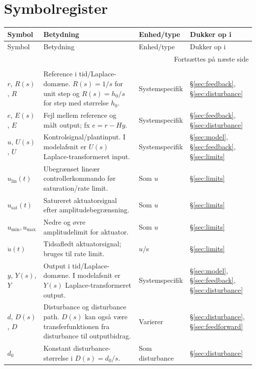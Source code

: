 \section{Symbolregister}
\label{sec:symbolregister}

\small
\begin{longtable}{@{}p{}p{}p{}p{}@{}}
\toprule
Symbol & Betydning & Enhed/type & Dukker op i \\
\midrule
\endfirsthead
\toprule
Symbol & Betydning & Enhed/type & Dukker op i \\
\midrule
\endhead
\midrule
\multicolumn{4}{r}{Fortsættes på næste side}\\
\endfoot
\bottomrule
\endlastfoot
\multicolumn{4}{@{}l}{\textbf{Signaler og signalveje}}\\
\(r\), \(R(s)\), \(R\) & Reference i tid/Laplace-domæne. \(R(s)=1/s\) for unit step og \(R(s)=h_0/s\) for step med størrelse \(h_0\). & Systemspecifik & \S\ref{sec:feedback}, \S\ref{sec:disturbance}\\
\(e\), \(E(s)\), \(E\) & Fejl mellem reference og målt output; fx \(e=r-Hy\). & Systemspecifik & \S\ref{sec:feedback}, \S\ref{sec:disturbance}\\
\(u\), \(U(s)\), \(U\) & Kontrolsignal/plantinput. I modelafsnit er \(U(s)\) Laplace-transformeret input. & Systemspecifik & \S\ref{sec:model}, \S\ref{sec:feedback}, \S\ref{sec:limits}\\
\(u_{\mathrm{lin}}(t)\) & Ubegrænset lineær controllerkommando før saturation/rate limit. & Som \(u\) & \S\ref{sec:limits}\\
\(u_{\mathrm{sat}}(t)\) & Satureret aktuatorsignal efter amplitudebegrænsning. & Som \(u\) & \S\ref{sec:limits}\\
\(u_{\min},u_{\max}\) & Nedre og øvre amplitudelimit for aktuator. & Som \(u\) & \S\ref{sec:limits}\\
\(\dot u(t)\) & Tidsafledt aktuatorsignal; bruges til rate limit. & \(u\)/s & \S\ref{sec:limits}\\
\(y\), \(Y(s)\), \(Y\) & Output i tid/Laplace-domæne. I modelafsnit er \(Y(s)\) Laplace-transformeret output. & Systemspecifik & \S\ref{sec:model}, \S\ref{sec:feedback}, \S\ref{sec:disturbance}\\
\(d\), \(D(s)\), \(D\) & Disturbance og disturbance path. \(D(s)\) kan også være transferfunktionen fra disturbance til outputbidrag. & Varierer & \S\ref{sec:disturbance}, \S\ref{sec:feedforward}\\
\(d_0\) & Konstant disturbance-størrelse i \(D(s)=d_0/s\). & Som disturbance & \S\ref{sec:disturbance}\\

\end{longtable}
